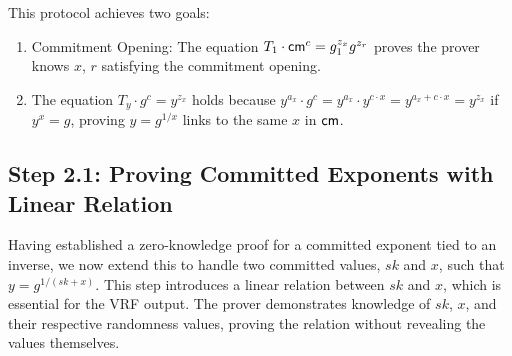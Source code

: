 This protocol achieves two goals:
\begin{enumerate}
    \item Commitment Opening: The equation $T_1 \cdot \mathsf{cm}^c = g_1^{z_x} g^{z_r}$ proves the prover knows $x$, $r$ satisfying the commitment opening.
    \item The equation $T_y \cdot g^c = y^{z_x}$ holds because $y^{a_x} \cdot g^c = y^{a_x} \cdot y^{c \cdot x} = y^{a_x + c \cdot x} = y^{z_x}$ if $y^x = g$, proving $y = g^{1/x}$ links to the same $x$ in $\mathsf{cm}$.
\end{enumerate}






\newpage
\subsection{Step 2.1: Proving Committed Exponents with Linear Relation}

Having established a zero-knowledge proof for a committed exponent tied to an inverse, we now extend this to handle two committed values, $sk$ and $x$, such that $y = g^{1/(sk + x)}$. This step introduces a linear relation between $sk$ and $x$, which is essential for the VRF output. The prover demonstrates knowledge of $sk$, $x$, and their respective randomness values, proving the relation without revealing the values themselves.


